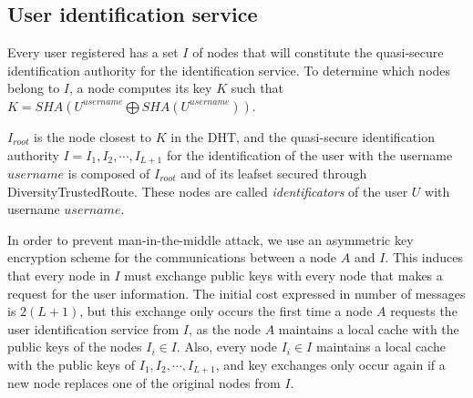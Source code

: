 \subsection{User identification service}
\label{sec:identificators}

Every user registered has a set $I$ of nodes that
will constitute the quasi-secure identification authority for the
identification service.
To determine which  nodes belong to $I$, a node computes its key $K$ such that
$K = SHA(U^{username} \bigoplus SHA(U^{username}))$. 

$I_{root}$ is the node closest to $K$ in the DHT, and the quasi-secure identification authority $I =
{I_1, I_2, \cdots, I_{L+1}}$ for the identification of the user with the
username $username$ is composed of $I_{root}$ and of its leafset secured
through DiversityTrustedRoute. These nodes are called \textit{identificators} of the
user $U$ with username $username$.

 In order to prevent man-in-the-middle attack, we use an asymmetric key
encryption scheme for the communications between a node $A$ and $I$. This
induces that every node in $I$ must exchange public keys with every node that
makes a request for the user information. The initial cost expressed in number
of messages is $2(L+1)$, but this exchange only occurs the first time a
node $A$ requests the user identification service from $I$, as the node $A$
maintains a local cache with the public keys of the nodes $I_i \in I$. Also,
every node $I_i \in I$ maintains a local cache with the public keys of ${I_1,
I_2, \cdots, I_{L+1}}$, and key exchanges only occur again if a new node
replaces one of the original nodes from $I$.

